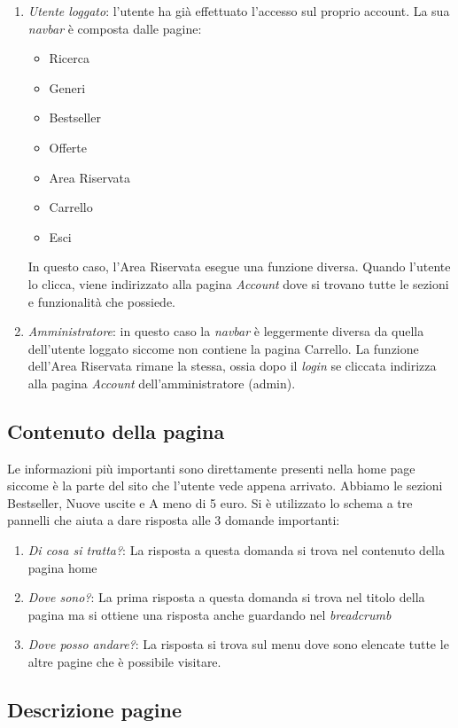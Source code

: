 \begin{enumerate}
		\item \textit{Utente loggato}: l’utente ha già effettuato l’accesso sul proprio account. La sua \textit{navbar} è composta dalle pagine:
			\begin{itemize}
				\item Ricerca
				\item Generi
				\item Bestseller
				\item Offerte
				\item Area Riservata
				\item Carrello
				\item Esci
			\end{itemize}
		In questo caso, l’Area Riservata esegue una funzione diversa. Quando l’utente lo clicca, viene indirizzato alla pagina \textit{Account} dove si trovano tutte le sezioni e funzionalità che possiede.
		\item \textit{Amministratore}: in questo caso la \textit{navbar} è leggermente diversa da quella dell'utente loggato siccome non contiene la pagina Carrello. La funzione dell'Area Riservata rimane la stessa, ossia dopo il \textit{login} se cliccata indirizza alla pagina \textit{Account} dell'amministratore (admin).
	\end{enumerate}
	
\subsection{Contenuto della pagina}
Le informazioni più importanti sono direttamente presenti nella home page siccome è la parte del sito che l’utente vede appena arrivato. Abbiamo le sezioni Bestseller, Nuove uscite e A meno di 5 euro.
Si è utilizzato lo schema a tre pannelli che aiuta a dare risposta alle 3 domande importanti:
\begin{enumerate}
	\item \textit{Di cosa si tratta?}: La risposta a questa domanda si trova nel contenuto della pagina home
	\item \textit{Dove sono?}: La prima risposta a questa domanda si trova nel titolo della pagina ma si ottiene
		una risposta anche guardando nel \textit{breadcrumb}
	\item \textit{Dove posso andare?}: La risposta si trova sul menu dove sono elencate tutte le altre pagine che
		è possibile visitare.
\end{enumerate}	

\subsection{Descrizione pagine}
